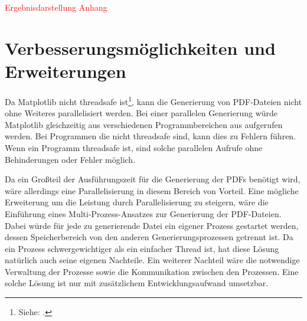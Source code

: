 \textcolor{red}{Ergebnisdarstellung Anhang}

\section{Verbesserungsmöglichkeiten und Erweiterungen}
Da Matplotlib nicht threadsafe ist\footnote{Siehe: \cite{Stackoverflow2016}.}, kann die Generierung von PDF-Dateien nicht ohne Weiteres parallelisiert werden.
Bei einer parallelen Generierung würde Matplotlib gleichzeitig aus verschiedenen Programmbereichen aus aufgerufen werden.
Bei Programmen die nicht threadsafe sind, kann dies zu Fehlern führen.
Wenn ein Programm threadsafe ist, sind solche parallelen Aufrufe ohne Behinderungen oder Fehler möglich.

Da ein Großteil der Ausführungszeit für die Generierung der PDFs benötigt wird, wäre allerdings eine Parallelisierung in diesem Bereich von Vorteil.
Eine mögliche Erweiterung um die Leistung durch Parallelisierung zu steigern, wäre die Einführung eines Multi-Prozess-Ansatzes zur Generierung der PDF-Dateien.
Dabei würde für jede zu generierende Datei ein eigener Prozess gestartet werden, dessen Speicherbereich von den anderen Generierungsprozessen getrennt ist.
Da ein Prozess schwergewichtiger als ein einfacher Thread ist, hat diese Lösung natürlich auch seine eigenen Nachteile.
Ein weiterer Nachteil wäre die notwendige Verwaltung der Prozesse sowie die Kommunikation zwischen den Prozessen.
Eine solche Lösung ist nur mit zusätzlichem Entwicklungsaufwand umsetzbar.